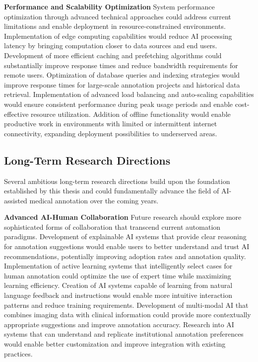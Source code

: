 \textbf{Performance and Scalability Optimization}
System performance optimization through advanced technical approaches could address current limitations and enable deployment in resource-constrained environments. Implementation of edge computing capabilities would reduce AI processing latency by bringing computation closer to data sources and end users. Development of more efficient caching and prefetching algorithms could substantially improve response times and reduce bandwidth requirements for remote users. Optimization of database queries and indexing strategies would improve response times for large-scale annotation projects and historical data retrieval. Implementation of advanced load balancing and auto-scaling capabilities would ensure consistent performance during peak usage periods and enable cost-effective resource utilization. Addition of offline functionality would enable productive work in environments with limited or intermittent internet connectivity, expanding deployment possibilities to underserved areas.

\subsection{Long-Term Research Directions}

Several ambitious long-term research directions build upon the foundation established by this thesis and could fundamentally advance the field of AI-assisted medical annotation over the coming years.

\textbf{Advanced AI-Human Collaboration}
Future research should explore more sophisticated forms of collaboration that transcend current automation paradigms. Development of explainable AI systems that provide clear reasoning for annotation suggestions would enable users to better understand and trust AI recommendations, potentially improving adoption rates and annotation quality. Implementation of active learning systems that intelligently select cases for human annotation could optimize the use of expert time while maximizing learning efficiency. Creation of AI systems capable of learning from natural language feedback and instructions would enable more intuitive interaction patterns and reduce training requirements. Development of multi-modal AI that combines imaging data with clinical information could provide more contextually appropriate suggestions and improve annotation accuracy. Research into AI systems that can understand and replicate institutional annotation preferences would enable better customization and improve integration with existing practices.

